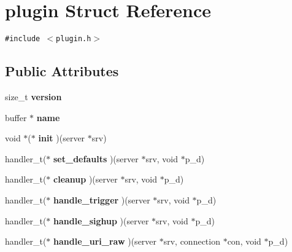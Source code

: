 \hypertarget{structplugin}{
\section{plugin Struct Reference}
\label{structplugin}
}
{\tt \#include $<$plugin.h$>$}

\subsection*{Public Attributes}
\begin{CompactItemize}
\item 
\hypertarget{structplugin_a4b3d495a0ae1df759643b712d91068f}{
size\_\-t \textbf{version}}
\label{structplugin_a4b3d495a0ae1df759643b712d91068f}

\item 
\hypertarget{structplugin_235162d1645d005e4d8ea2cedc80a236}{
buffer $\ast$ \textbf{name}}
\label{structplugin_235162d1645d005e4d8ea2cedc80a236}

\item 
\hypertarget{structplugin_241bc6c5b4cb17a235b0947fac9d34d5}{
void $\ast$($\ast$ \textbf{init} )(server $\ast$srv)}
\label{structplugin_241bc6c5b4cb17a235b0947fac9d34d5}

\item 
\hypertarget{structplugin_04251883174cadf3e02ae1b1a388bdb7}{
handler\_\-t($\ast$ \textbf{set\_\-defaults} )(server $\ast$srv, void $\ast$p\_\-d)}
\label{structplugin_04251883174cadf3e02ae1b1a388bdb7}

\item 
\hypertarget{structplugin_c092882ffd286543515174a8bd3b70d2}{
handler\_\-t($\ast$ \textbf{cleanup} )(server $\ast$srv, void $\ast$p\_\-d)}
\label{structplugin_c092882ffd286543515174a8bd3b70d2}

\item 
\hypertarget{structplugin_6490af8e037a60d248395a8c68ee83f0}{
handler\_\-t($\ast$ \textbf{handle\_\-trigger} )(server $\ast$srv, void $\ast$p\_\-d)}
\label{structplugin_6490af8e037a60d248395a8c68ee83f0}

\item 
\hypertarget{structplugin_aa3aaf5324316058a36ab97ab7303a62}{
handler\_\-t($\ast$ \textbf{handle\_\-sighup} )(server $\ast$srv, void $\ast$p\_\-d)}
\label{structplugin_aa3aaf5324316058a36ab97ab7303a62}

\item 
\hypertarget{structplugin_e798106278e8cd7e7241b1f1ee9ac914}{
handler\_\-t($\ast$ \textbf{handle\_\-uri\_\-raw} )(server $\ast$srv, connection $\ast$con, void $\ast$p\_\-d)}
\label{structplugin_e798106278e8cd7e7241b1f1ee9ac914}


\end{CompactItemize}
